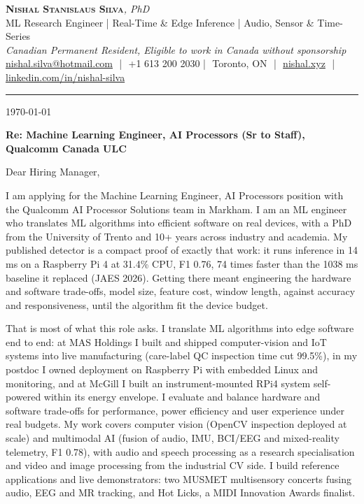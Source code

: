\documentclass[11pt]{article}
\makeatletter
\newcommand{\clName}{Nishal Stanislaus Silva}
\newcommand{\clEmail}{nishal.silva@hotmail.com}
\newcommand{\clPhone}{+1 613 200 2030}
\newcommand{\clCity}{Toronto, ON}
\newcommand{\clSite}{https://nishal.xyz}
\newcommand{\clLinkedIn}{https://www.linkedin.com/in/nishal-silva}
\newcommand{\clStatus}{Canadian Permanent Resident, Eligible to work in Canada without sponsorship}
\newcommand{\clTagline}{ML Research Engineer | Real-Time \& Edge Inference | Audio, Sensor \& Time-Series}
\newcommand{\clRole}{Machine Learning Engineer, AI Processors (Sr to Staff)}
\newcommand{\clCompany}{Qualcomm Canada ULC}
\newcommand{\clAddressee}{Dear Hiring Manager,}
\makeatother
\begin{document}
\pagestyle{empty}
\begin{center}
    {\LARGE \scshape \textbf{\clName}}{\large \textit{, PhD}}\\[1pt]
    {\small \clTagline}\\[1pt]
    {\footnotesize\textit{\clStatus}}\\[1pt]
    {\small
    \href{mailto:\clEmail}{\clEmail} \,\,|\,\, \clPhone \,\,|\,\, \clCity
    \,\,|\,\, \href{\clSite}{nishal.xyz} \,\,|\,\, \href{\clLinkedIn}{linkedin.com/in/nishal-silva}}
\end{center}

\rule{\linewidth}{0.4pt}\vspace{0.6em}

\today

\textbf{Re: \clRole{}, \clCompany{}}

\clAddressee

I am applying for the Machine Learning Engineer, AI Processors position with the Qualcomm AI Processor Solutions team in Markham. I am an ML engineer who translates ML algorithms into efficient software on real devices, with a PhD from the University of Trento and 10+ years across industry and academia. My published detector is a compact proof of exactly that work: it runs inference in 14 ms on a Raspberry Pi 4 at 31.4\% CPU, F1 0.76, 74 times faster than the 1038 ms baseline it replaced (JAES 2026). Getting there meant engineering the hardware and software trade-offs, model size, feature cost, window length, against accuracy and responsiveness, until the algorithm fit the device budget.

That is most of what this role asks. I translate ML algorithms into edge software end to end: at MAS Holdings I built and shipped computer-vision and IoT systems into live manufacturing (care-label QC inspection time cut 99.5\%), in my postdoc I owned deployment on Raspberry Pi with embedded Linux and monitoring, and at McGill I built an instrument-mounted RPi4 system self-powered within its energy envelope. I evaluate and balance hardware and software trade-offs for performance, power efficiency and user experience under real budgets. My work covers computer vision (OpenCV inspection deployed at scale) and multimodal AI (fusion of audio, IMU, BCI/EEG and mixed-reality telemetry, F1 0.78), with audio and speech processing as a research specialisation and video and image processing from the industrial CV side. I build reference applications and live demonstrators: two MUSMET multisensory concerts fusing audio, EEG and MR tracking, and Hot Licks, a MIDI Innovation Awards finalist.
\end{document}
